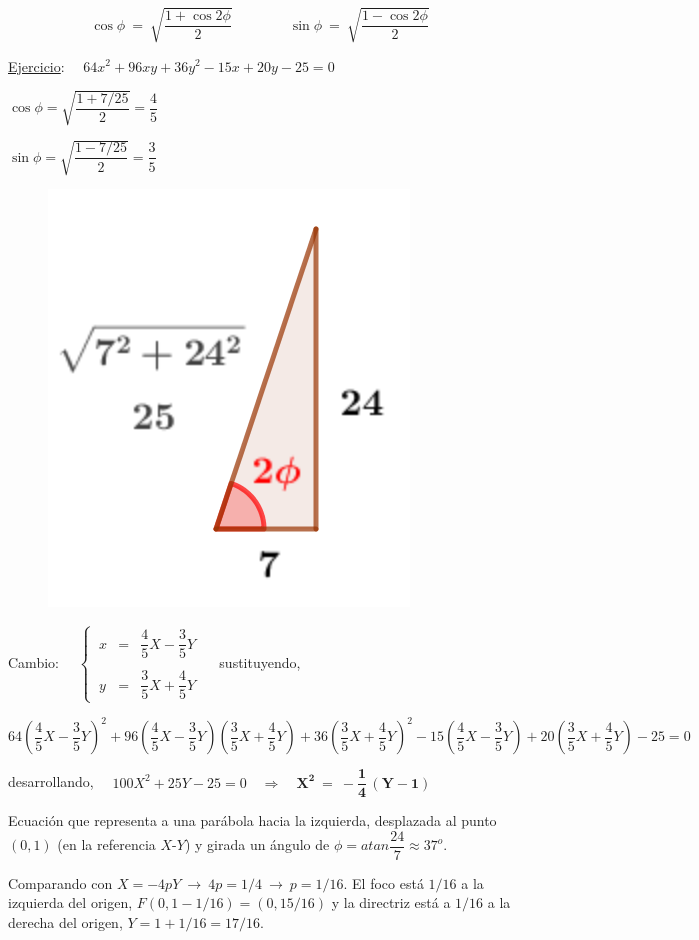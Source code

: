 $$ \cos \phi \ = \ \sqrt{\dfrac{1+\cos 2\phi}{2}} \qquad \qquad  \sin \phi \ = \ \sqrt{\dfrac{1-\cos 2\phi}{2}} $$


\vspace{10mm} \underline{Ejercicio}: $\quad 64x^2+96xy+36y^2-15x+20y-25=0$ 

\vspace{5mm}
\begin{multicols}{2}
$\cos \phi=\sqrt{\dfrac{1+7/25}{2}}=\dfrac 4 5$

$\sin \phi=\sqrt{\dfrac{1-7/25}{2}}=\dfrac 3 5$
\begin{figure}[H]
	\centering
	\includegraphics[width=.2\textwidth]{img-conicas/conicas53.png}
	\end{figure}	
\end{multicols}

Cambio: $ \quad \left\{ \ \begin{array}{lcl} x&=&\dfrac 4 5 X - \dfrac 3 5 Y \\  \\ y&=& \dfrac 3 5 X + \dfrac 4 5 Y \end{array} \right. \quad $ sustituyendo,


\begin{small}
$64 \left( \dfrac 4 5 X - \dfrac 3 5 Y  \right)^2+96\left( \dfrac 4 5 X - \dfrac 3 5 Y  \right)\left( \dfrac 3 5 X + \dfrac 4 5 Y  \right)+36 \left( \dfrac 3 5 X + \dfrac 4 5 Y  \right)^2-15 \left( \dfrac 4 5 X - \dfrac 3 5 Y  \right) +20 \left( \dfrac 3 5 X + \dfrac 4 5 Y  \right)-25=0$
\end{small}

desarrollando, $\quad 100X^2+25Y-25=0 \quad \Rightarrow \quad \boldsymbol{X^2 \ = \ - \dfrac 1 4 \, (Y-1)}$

Ecuación que representa a una parábola hacia la izquierda, desplazada al punto $(0,1)$ (en la referencia $X$-$Y$) y girada un ángulo de $\phi=atan \dfrac {24}{7}\approx 37^o$.

Comparando con $X=-4pY \ \to \ 4p=1/4 \ \to \ p=1/16$. El foco está $1/16$ a la izquierda del origen, $F(0,1-1/16)=(0,15/16)$ y la directriz está a $1/16$ a la derecha del origen, $Y=1+1/16=17/16$.

